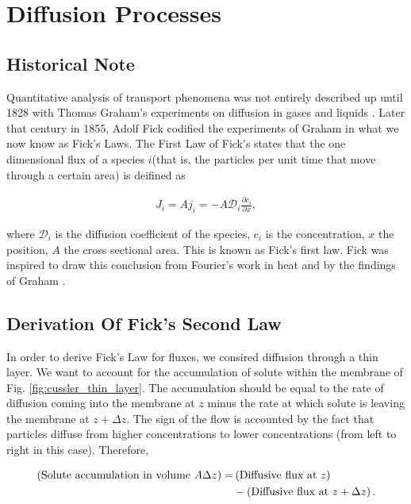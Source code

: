 \section{Diffusion Processes}


\subsection{Historical Note}

\par Quantitative analysis of transport phenomena was not entirely described up until 1828 with Thomas Graham's experiments on diffusion in gases and liquids \cite{cussler}. Later that century in 1855, Adolf Fick codified the experiments of Graham in what we now know as Fick's Laws. The First Law of Fick's states that the one dimensional flux of a species $i$(that is, the particles per unit time that move through a certain area) is deifined as \cite{cussler}

\begin{align}
\label{eq:fick-fluxes}
	J_i = A j_i = -A\mathcal{D}_i\frac{\partial c_i}{\partial x},
\end{align}

where $\mathcal{D}_i$ is the diffusion coefficient of the species, $c_i$ is the concentration, $x$ the position, $A$ the cross sectional area. This is known as Fick's first law. Fick was inspired to draw this conclusion from Fourier's work in heat and by the findings of Graham \cite{fick}.


\subsection{Derivation Of Fick's Second Law}

In order to derive Fick's Law for fluxes, we consired diffusion through a thin layer. We want to account for the accumulation of solute within the membrane of Fig. \ref{fig:cussler_thin_layer}. The accumulation should be equal to the rate of diffusion coming into the membrane at $z$ minus the rate at which solute is leaving the membrane at $z+\Delta z$. The sign of the flow is accounted by the fact that particles diffuse from higher concentrations to lower concentrations (from left to right in this case). Therefore,

\begin{align}
	\left({\textnormal{Solute accumulation in volume }A\Delta z}\right) =& \left({\textnormal{Diffusive flux at } z }\right) \nonumber\\
	&- \left({\textnormal{Diffusive flux at } z+\Delta z}\right).\nonumber
\end{align}


